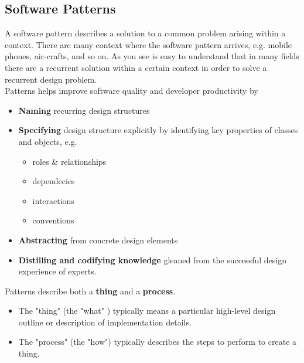 \subsection{Software Patterns}
\label{subsec:AT-01-SW-Patterns}

A software pattern describes a solution to a common problem arising within a context. There are many context where the software pattern arrives, e.g. mobile phones, air-crafts, and so on. As you see is easy to understand that in many fields there are a recurrent solution within a certain context in order to solve a recurrent design problem.\\

Patterns helps improve software quality and developer productivity by
\begin{itemize}
    \item \textbf{Naming} recurring design structures
    \item \textbf{Specifying} design structure explicitly by identifying key properties of classes and objects, e.g. 
        \begin{itemize}
            \item roles \& relationships
            \item dependecies
            \item interactions
            \item conventions
        \end{itemize}
    \item \textbf{Abstracting} from concrete design elements
    \item \textbf{Distilling and codifying knowledge} gleaned from the successful design experience of experts.
\end{itemize}

Patterns describe both a \textbf{thing} and a \textbf{process}.

\begin{itemize}
    \item The "thing" (the "what" ) typically means a particular high-level design outline or description of implementation details.

    \item The "process" (the "how") typically describes the steps to perform to create a thing.
\end{itemize}